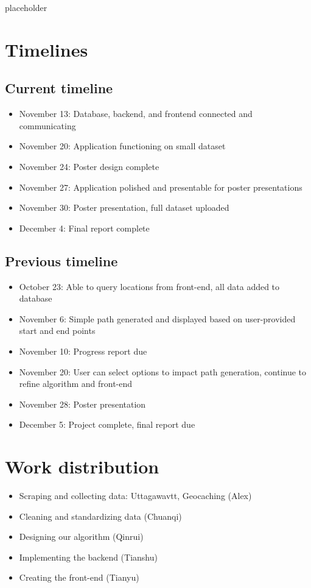 \documentclass[sigconf]{acmart}
\begin{document}
placeholder
\appendix
\section{Timelines}
\subsection{Current timeline}

\begin{itemize}
	\item November 13: Database, backend, and frontend connected and communicating
	\item November 20: Application functioning on small dataset
	\item November 24: Poster design complete
	\item November 27: Application polished and presentable for poster presentations
	\item November 30: Poster presentation, full dataset uploaded
	\item December 4: Final report complete
\end{itemize}

\subsection{Previous timeline}
\begin{itemize}
	\item October 23: Able to query locations from front-end, all data added to database
	\item November 6: Simple path generated and displayed based on user-provided start and end points
	\item November 10: Progress report due
	\item November 20: User can select options to impact path generation, continue to refine algorithm and front-end
	\item November 28: Poster presentation
	\item December 5: Project complete, final report due
\end{itemize}

\section{Work distribution}

\begin{itemize}
	\item Scraping and collecting data: Uttagawavtt, Geocaching (Alex)
	\item Cleaning and standardizing data (Chuanqi)
	\item Designing our algorithm (Qinrui)
	\item Implementing the backend (Tianshu)
	\item Creating the front-end (Tianyu)
\end{itemize}
\end{document}
